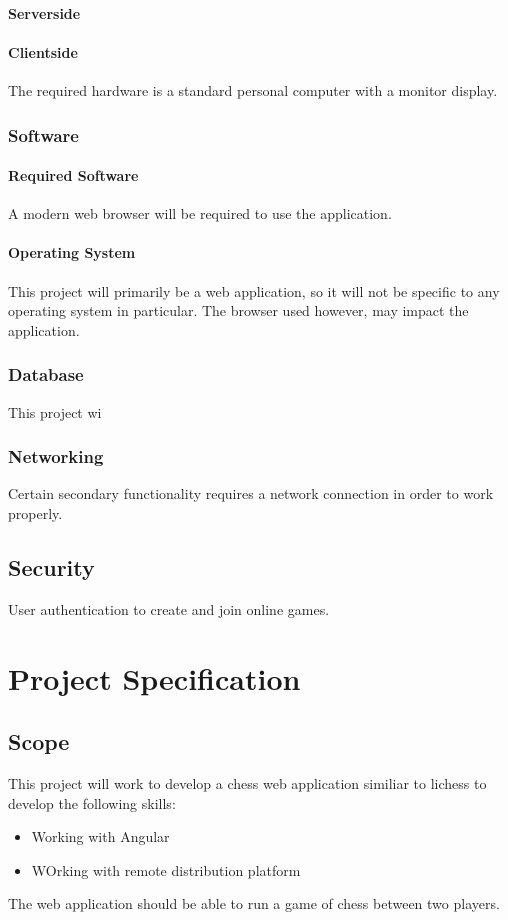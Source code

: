 \documentclass{article}
\begin{document}
\paragraph{Serverside}

\paragraph{Clientside}
The required hardware is a standard personal computer with a monitor display.
\subsubsection{Software}
\paragraph{Required Software}
A modern web browser will be required to use the application.
\paragraph{Operating System}
This project will primarily be a web application, so it will not be specific to any operating system in particular. The browser used however, may impact the application.
\subsubsection{Database}
This project wi
\subsubsection{Networking}
Certain secondary functionality requires a network connection in order to work properly.
\subsection{Security}
User authentication to create and join online games.


\newpage
\section{Project Specification}
\subsection{Scope}
This project will work to develop a chess web application similiar to lichess to develop the following skills:
\begin{itemize}
\item Working with Angular
\item WOrking with remote distribution platform
\end{itemize}
The web application should be able to run a game of chess between two players.
\end{document}
